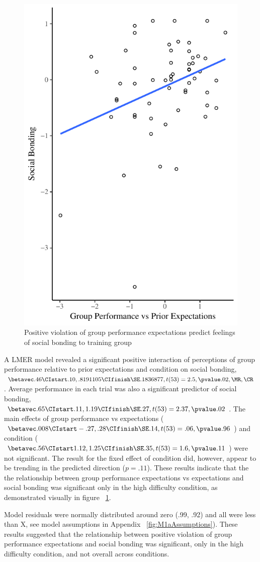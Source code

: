 \begin{figure}
  \centering
  \includegraphics[width=0.5\linewidth,keepaspectratio] {images/groupPerfExpBondConditionScatter}
  \caption{Positive violation of group performance expectations
 predict feelings of social bonding to training group}
 \label{fig:groupPerfExpBondConditionScatter}
\end{figure}

A LMER model revealed a significant positive interaction of perceptions of group performance relative to prior expectations and condition on social bonding, $\betavec .46 \CIstart .10, .8191105 \CIfinish \SE .1836877, t(53) = 2.5, \pvalue .02, \MR , \CR $.  Average performance in each trial was also a significant predictor of social bonding, $\betavec .65 \CIstart .11, 1.19 \CIfinish \SE .27, t(53) = 2.37, \pvalue .02$.
The main effects of group performance vs expectations ($\betavec .008 \CIstart -.27, .28 \CIfinish \SE .14, t(53) = .06, \pvalue .96$) and condition ($\betavec .56 \CIstart 1.12, 1.25 \CIfinish \SE .35, t(53) = 1.6, \pvalue .11$) were not significant. The result for the fixed effect of condition did, however, appear to be trending in the predicted direction ($p = .11$). These results indicate that the the relationship between group performance expectations vs expectations and social bonding was significant only in the high difficulty condition, as demonstrated visually in figure ~\ref{fig:groupPerfExpBondConditionScatter}.

Model residuals were normally distributed around zero (\resdist .99, \pvalue .92) and all \cooksD were less than X, see model assumptions in Appendix  ~\ref{fig:M1aAssumptions}).  These results suggested that the relationship between positive violation of group performance expectations and social bonding was significant, only in the high difficulty condition, and not overall across conditions.





